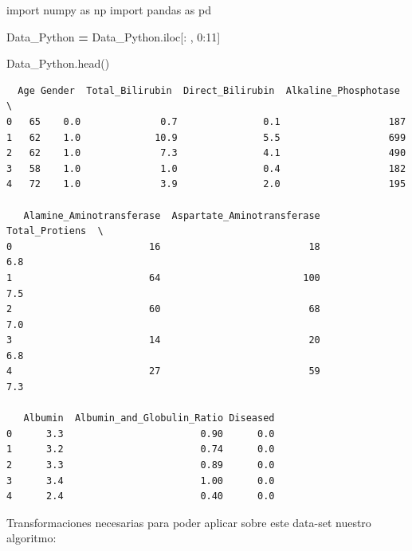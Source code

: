 \documentclass[
  11pt,
  a4paper,
]{article}
\newenvironment{Shaded}{\begin{snugshade}}{\end{snugshade}}
\newcommand{\DecValTok}[1]{\textcolor[rgb]{0.00,0.00,0.81}{#1}}
\newcommand{\ImportTok}[1]{#1}
\newcommand{\NormalTok}[1]{#1}
\newcommand{\OperatorTok}[1]{\textcolor[rgb]{0.81,0.36,0.00}{\textbf{#1}}}
\begin{document}
\begin{Shaded}
\begin{Highlighting}[]
\ImportTok{import}\NormalTok{ numpy }\ImportTok{as}\NormalTok{ np}
\ImportTok{import}\NormalTok{ pandas }\ImportTok{as}\NormalTok{ pd}
\end{Highlighting}
\end{Shaded}

\begin{Shaded}
\begin{Highlighting}[]
\NormalTok{Data\_Python }\OperatorTok{=}\NormalTok{ Data\_Python.iloc[: , }\DecValTok{0}\NormalTok{:}\DecValTok{11}\NormalTok{]}
\end{Highlighting}
\end{Shaded}

\begin{Shaded}
\begin{Highlighting}[]
\NormalTok{Data\_Python.head()}
\end{Highlighting}
\end{Shaded}

\begin{verbatim}
  Age Gender  Total_Bilirubin  Direct_Bilirubin  Alkaline_Phosphotase  \
0   65    0.0              0.7               0.1                   187   
1   62    1.0             10.9               5.5                   699   
2   62    1.0              7.3               4.1                   490   
3   58    1.0              1.0               0.4                   182   
4   72    1.0              3.9               2.0                   195   

   Alamine_Aminotransferase  Aspartate_Aminotransferase  Total_Protiens  \
0                        16                          18             6.8   
1                        64                         100             7.5   
2                        60                          68             7.0   
3                        14                          20             6.8   
4                        27                          59             7.3   

   Albumin  Albumin_and_Globulin_Ratio Diseased  
0      3.3                        0.90      0.0  
1      3.2                        0.74      0.0  
2      3.3                        0.89      0.0  
3      3.4                        1.00      0.0  
4      2.4                        0.40      0.0 
\end{verbatim}

Transformaciones necesarias para poder aplicar sobre este data-set
nuestro algoritmo:
\end{document}
